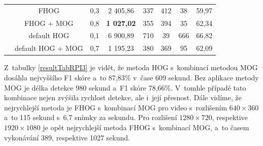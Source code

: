 \begin{table}[H]
\begin{tabular}{|c|c|c|c|c|c|c|c|}
      & FHOG                         &  0,3            & 2 405,86     & 337 &   412 &     38 &      59,97      \\ \cline{2-8}  
      & FHOG + MOG                   &  0,8            & \textbf{1 027,02}     & 355 &   394 &     35 &      62,34      \\ \cline{2-8}   
      &  default HOG                 &  0,1            & 6 900,89     & 710 &   39 &      666 &     66,82      \\ \cline{2-8}  
      &  default HOG + MOG           &  0,7            & 1 195,23     & 380 &  369 &     95 &      62,09      \\ \hline
\end{tabular}
\end{table}
Z~tabulky \ref{resultTabRPI3} je vidět, že metoda HOG s~kombinací metodou MOG dosáhla nejvyššího F1 skóre a~to 87,83\% v~čase 609 sekund. Bez aplikace metody MOG je délka detekce 980 sekund a~F1 skóre 78,66\%. V~tomhle případě tato kombinace nejen zvýšila rychlost detekce, ale i~její přesnost. Dále vidíme, že nejrychlejší metoda je FHOG s~kombinací MOG pro video s~rozlišením $640\times360$ a~to 115 sekund s~6,7 snímky za sekundu. Pro rozlišení $1280\times720$, respektive $1920\times1080$ je opět nejrychlejší metoda FHOG s~kombinací MOG, a~to časem vykonávání 389, respektive 1027 sekund.


